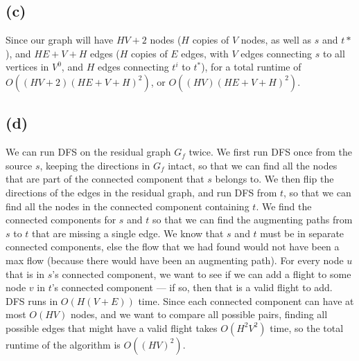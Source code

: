 \documentclass{6046}
\begin{document}
\subsection*{(c)}
Since our graph will have $HV + 2$ nodes ($H$ copies of $V$ nodes, as well as $s$ and $t*$),
and $HE + V + H$ edges ($H$ copies of $E$ edges, with $V$ edges
connecting $s$ to all vertices in $V^0$, and $H$ edges connecting $t^i$ to $t^*$),
for a total runtime of $O((HV + 2)(HE + V + H)^2)$, or $O((HV)(HE + V + H)^2)$.

\subsection*{(d)}
We can run DFS on the residual graph $G_f$ twice.
We first run DFS once from the source $s$, keeping the directions
in $G_f$ intact, so that we can find all the nodes that are part of
the connected component that $s$ belongs to. We then flip the directions of
the edges in the residual graph, and run DFS from $t$, so that we can find
all the nodes in the connected component containing $t$. We find the
connected components for $s$ and $t$ so that we can find the augmenting paths
from $s$ to $t$ that are missing a single edge. We know that $s$ and $t$ must be in
separate connected components, else the flow that we had found would not have
been a max flow (because there would have been an augmenting path). For every node $u$ that is in $s$'s
connected component, we want to see if we can add a flight to some node $v$ in $t$'s
connected component --- if so, then that is a valid flight to add. DFS runs in $O(H(V + E))$
time. Since each connected component can have at most $O(HV)$ nodes, and we want to
compare all possible pairs, finding all possible edges that might have a valid flight
takes $O(H^2V^2)$ time, so the total runtime of the algorithm is $O((HV)^2)$.
\end{document}
